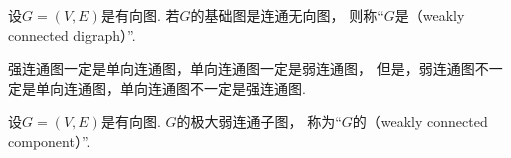 \begin{definition}
设\(G = (V,E)\)是有向图.
若\(G\)的基础图是连通无向图，
则称“\(G\)是（weakly connected digraph）”.
\end{definition}

强连通图一定是单向连通图，单向连通图一定是弱连通图，
但是，弱连通图不一定是单向连通图，单向连通图不一定是强连通图.

\begin{definition}
设\(G = (V,E)\)是有向图.
\(G\)的极大弱连通子图，
称为“\(G\)的（weakly connected component）”.
\end{definition}

